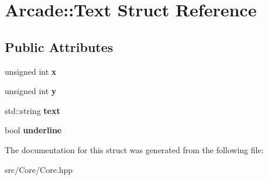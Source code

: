 \hypertarget{struct_arcade_1_1_text}{}\section{Arcade\+:\+:Text Struct Reference}
\label{struct_arcade_1_1_text}
\subsection*{Public Attributes}
\begin{DoxyCompactItemize}
\item 
\mbox{\label{struct_arcade_1_1_text_ad40c194c65d5599d0405e0ff2817c623}} 
unsigned int {\bfseries x}
\item 
\mbox{\label{struct_arcade_1_1_text_a1236f9e7867551b733e4ae20210018fb}} 
unsigned int {\bfseries y}
\item 
\mbox{\label{struct_arcade_1_1_text_ade87041cd59ed97cb27746c4a2747495}} 
std\+::string {\bfseries text}
\item 
\mbox{\label{struct_arcade_1_1_text_a0762ebef8ec34ee3281b6d509a8693a0}} 
bool {\bfseries underline}
\end{DoxyCompactItemize}


The documentation for this struct was generated from the following file\+:\begin{DoxyCompactItemize}
\item 
src/\+Core/Core.\+hpp\end{DoxyCompactItemize}

